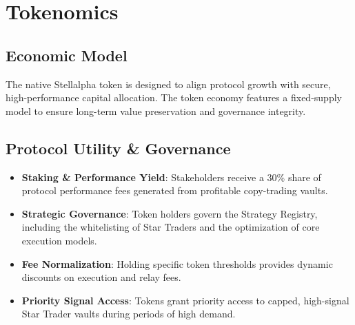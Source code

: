 \section{Tokenomics}

\subsection{Economic Model}

The native Stellalpha token is designed to align protocol growth with secure, high-performance capital allocation. The token economy features a fixed-supply model to ensure long-term value preservation and governance integrity.

\subsection{Protocol Utility \& Governance}

\begin{itemize}
  \item \textbf{Staking \& Performance Yield}: Stakeholders receive a 30\% share of protocol performance fees generated from profitable copy-trading vaults.      
  \item \textbf{Strategic Governance}: Token holders govern the Strategy Registry, including the whitelisting of Star Traders and the optimization of core execution models.
  \item \textbf{Fee Normalization}: Holding specific token thresholds provides dynamic discounts on execution and relay fees.
  \item \textbf{Priority Signal Access}: Tokens grant priority access to capped, high-signal Star Trader vaults during periods of high demand.
\end{itemize}
